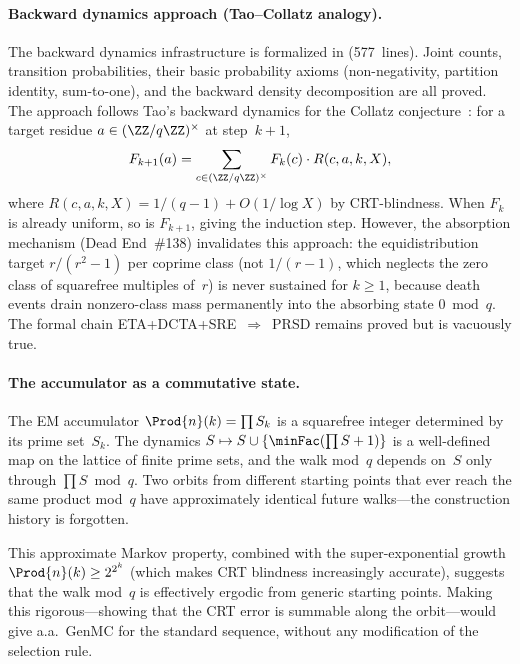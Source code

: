 \paragraph{Backward dynamics approach (Tao--Collatz analogy).}
The backward dynamics infrastructure is formalized in
 (577~lines).
Joint counts, transition probabilities, their basic probability axioms
(non-negativity, partition identity, sum-to-one), and the backward
density decomposition are all proved.
The approach follows Tao's backward
dynamics for the Collatz conjecture~\cite{Tao2019Collatz}: for a
target residue $a \in (\ZZ/q\ZZ)^\times$ at step~$k{+}1$,
\[
  F_{k+1}(a) = \sum_{c \in (\ZZ/q\ZZ)^\times} F_k(c) \cdot R(c, a, k, X),
\]
where $R(c, a, k, X) = 1/(q{-}1) + O(1/\log X)$ by CRT-blindness.
When $F_k$ is already uniform, so is $F_{k+1}$, giving the induction
step.  However, the absorption mechanism (Dead End~\#138)
invalidates this approach: the equidistribution target
$r/(r^2{-}1)$ per coprime class (not $1/(r{-}1)$, which neglects
the zero class of squarefree multiples of~$r$) is never sustained
for $k \geq 1$, because death events drain nonzero-class mass
permanently into the absorbing state $0 \bmod q$.
The formal chain ETA+DCTA+SRE~$\Rightarrow$~PRSD remains proved
but is vacuously true.

\paragraph{The accumulator as a commutative state.}
The EM accumulator $\Prod{n}(k) = \prod S_k$ is a squarefree integer
determined by its prime set~$S_k$.  The dynamics
$S \mapsto S \cup \{\minFac(\prod S + 1)\}$ is a well-defined map on
the lattice of finite prime sets, and the walk mod~$q$ depends on~$S$
only through $\prod S \bmod q$.  Two orbits from different starting
points that ever reach the same product mod~$q$ have approximately
identical future walks---the construction history is forgotten.

This approximate Markov property, combined with the super-exponential
growth $\Prod{n}(k) \geq 2^{2^k}$ (which makes CRT blindness
increasingly accurate), suggests that the walk mod~$q$ is effectively
ergodic from generic starting points.  Making this rigorous---showing
that the CRT error is summable along the orbit---would give a.a.\
$\mathrm{GenMC}$ for the standard sequence, without any modification
of the selection rule.

